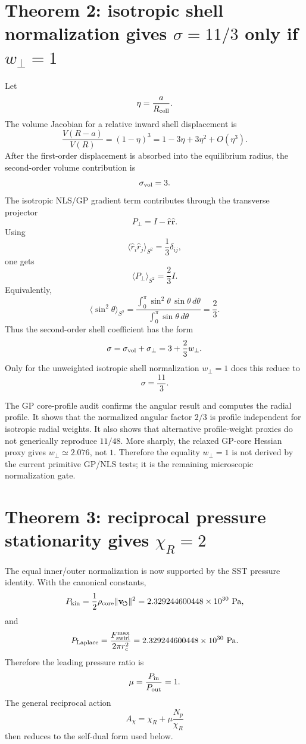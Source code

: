 \documentclass[11pt]{article}
\begin{document}
\section{Theorem 2: isotropic shell normalization gives \(\sigma=11/3\) only if \(w_\perp=1\)}

Let
\[
  \eta=\frac{a}{R_{\rm cell}}.
\]
The volume Jacobian for a relative inward shell displacement is
\[
  \frac{V(R-a)}{V(R)}
  =
  (1-\eta)^3
  =
  1-3\eta+3\eta^2+O(\eta^3).
\]
After the first-order displacement is absorbed into the equilibrium radius, the
second-order volume contribution is
\[
  \sigma_{\rm vol}=3.
\]
The isotropic NLS/GP gradient term contributes through the transverse
projector
\[
  P_\perp=I-\hat{\mathbf r}\hat{\mathbf r}.
\]
Using
\[
  \langle \hat r_i\hat r_j\rangle_{S^2}
  =
  \frac13\delta_{ij},
\]
one gets
\[
  \langle P_\perp\rangle_{S^2}
  =
  \frac23 I.
\]
Equivalently,
\[
  \langle\sin^2\theta\rangle_{S^2}
  =
  \frac{\int_0^\pi \sin^2\theta\,\sin\theta\,d\theta}
       {\int_0^\pi \sin\theta\,d\theta}
  =
  \frac23.
\]
Thus the second-order shell coefficient has the form
\[
  \sigma
  =
  \sigma_{\rm vol}+\sigma_\perp
  =
  3+\frac23w_\perp .
\]
Only for the unweighted isotropic shell normalization \(w_\perp=1\) does this
reduce to
\[
  \sigma=\frac{11}{3}.
\]


The GP core-profile audit confirms the angular result and computes the radial
profile.  It shows that the normalized angular factor \(2/3\) is profile
independent for isotropic radial weights.  It also shows that alternative
profile-weight proxies do not generically reproduce \(11/48\).  More sharply,
the relaxed GP-core Hessian proxy gives \(w_\perp\simeq2.076\), not \(1\).
Therefore the equality \(w_\perp=1\) is not derived by the current primitive
GP/NLS tests; it is the remaining microscopic normalization gate.

\section{Theorem 3: reciprocal pressure stationarity gives \(\chi_R=2\)}


The equal inner/outer normalization is now supported by the SST pressure
identity.  With the canonical constants,
\[
  P_{\rm kin}
  =
  \frac12\rho_{\rm core}
  \lVert\mathbf v_{\!\boldsymbol{\circlearrowleft}}\rVert^2
  =
  2.329244600448\times10^{30}\ {\rm Pa},
\]
and
\[
  P_{\rm Laplace}
  =
  \frac{F_{\rm swirl}^{\max}}{2\pi r_c^2}
  =
  2.329244600448\times10^{30}\ {\rm Pa}.
\]
Therefore the leading pressure ratio is
\[
  \mu=\frac{P_{\rm in}}{P_{\rm out}}=1.
\]
The general reciprocal action
\[
  A_\chi=\chi_R+\mu\frac{N_p}{\chi_R}
\]
then reduces to the self-dual form used below.
\end{document}
